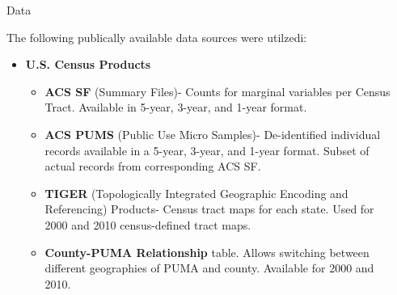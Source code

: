 \documentclass[final]{beamer}
\newlength{\sepwid}
\newlength{\onecolwid}
\newlength{\twocolwid}
\begin{document}
\begin{frame}[t]
\begin{columns}[t]
\begin{column}{\sepwid}\end{column} %

\begin{column}{\twocolwid} %

\begin{columns}[t,totalwidth=\twocolwid] %

\begin{column}{\onecolwid}\vspace{-.6in} %


\begin{block}{Data}

The following publically available data sources were utilzedi:

\begin{itemize}
\item \textbf{U.S. Census Products}
\begin{itemize}
\item \textbf{ACS SF} (Summary Files)- Counts for marginal variables per Census Tract.  Available in 5-year, 3-year, and 1-year format.
\item \textbf{ACS PUMS} (Public Use Micro Samples)- De-identified individual records available in a 5-year, 3-year, and 1-year format.  Subset of actual records from corresponding ACS SF.
\item \textbf{TIGER} (Topologically Integrated Geographic Encoding and Referencing) Products- Census tract maps for each state.  Used for 2000 and 2010 census-defined tract maps.
\item \textbf{County-PUMA Relationship} table.  Allows switching between different geographies of PUMA and county.  Available for 2000 and 2010.
\end{itemize}
\end{itemize}

\end{block}


\end{column} %


\end{columns}
\end{column}
\end{columns}
\end{frame}
\end{document}
